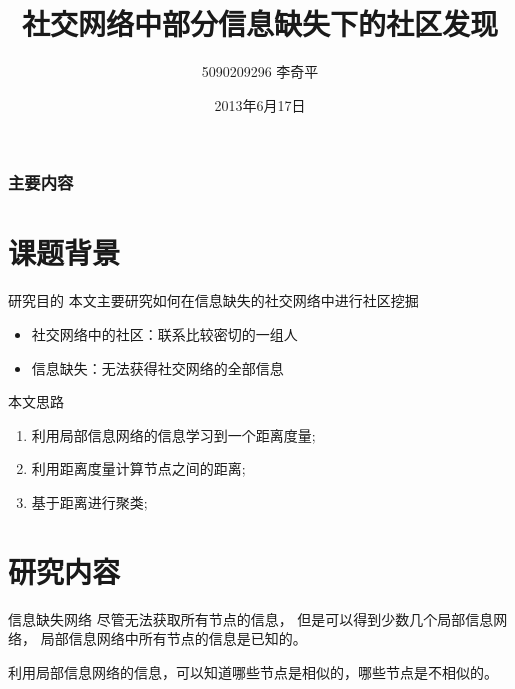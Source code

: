 \documentclass[14pt]{beamer}
\title{社交网络中部分信息缺失下的社区发现}
\author{5090209296 李奇平}
\institute{指导教师：王灿、陈英}
\date{2013年6月17日}
\begin{document}
\begin{frame}[plain]\transboxout
\titlepage
\end{frame}

\begin{frame}\transboxin
\frametitle{主要内容}
\tableofcontents[hideallsubsections]
\end{frame}

\section{课题背景}

\begin{frame}{研究目的}
本文主要研究如何在信息缺失的社交网络中进行社区挖掘 \pause
\begin{itemize}[<+->]
\item 社交网络中的社区：联系比较密切的一组人
\item 信息缺失：无法获得社交网络的全部信息
\end{itemize}
\end{frame}

\begin{frame}[fragile]{本文思路}
\begin{enumerate}[<+->]
\item 利用局部信息网络的信息学习到一个距离度量;
\item 利用距离度量计算节点之间的距离;
\item 基于距离进行聚类;
\end{enumerate}
\end{frame}


\section{研究内容}

\begin{frame}{信息缺失网络}
尽管无法获取所有节点的信息，
但是可以得到少数几个局部信息网络，
局部信息网络中所有节点的信息是已知的。\pause

利用局部信息网络的信息，可以知道哪些节点是相似的，哪些节点是不相似的。
\end{frame}
\end{document}
